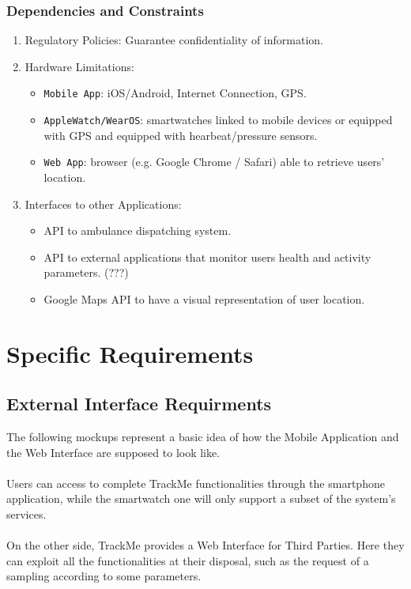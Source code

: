 \documentclass[12pt,a4paper]{article}
\begin{document}
		\subsubsection{Dependencies and Constraints}
			\begin{enumerate}
				\item Regulatory Policies:
				Guarantee confidentiality of information.
				\item Hardware Limitations: 
				\begin{itemize}
					\item \texttt{Mobile App}: iOS/Android, Internet Connection, GPS.
					\item \texttt{AppleWatch/WearOS}: smartwatches linked to mobile devices or equipped with GPS and equipped with hearbeat/pressure sensors.
					\item \texttt{Web App}: browser (e.g. Google Chrome / Safari) able to retrieve users' location.
				\end{itemize}
				\item Interfaces to other Applications: 
				\begin{itemize}
					\item API to ambulance dispatching system.
					\item API to external applications that monitor users health and activity parameters. (???)
					\item Google Maps API to have a visual representation of user location.
				\end{itemize}
			\end{enumerate}
	
	\newpage
	\section{Specific Requirements}
		\subsection{External Interface Requirments}
			The following mockups represent a basic idea of how the Mobile Application and the Web Interface are supposed to look like.
			\\ \\
			Users can access to complete TrackMe functionalities through the smartphone application, while the smartwatch one will only support a subset of the system's services.
			\\ \\
			On the other side, TrackMe provides a Web Interface for Third Parties. Here they can exploit all the functionalities at their disposal, such as the request of a sampling according to some parameters.
			
\end{document}
